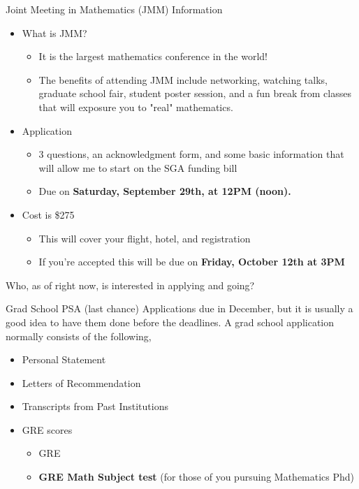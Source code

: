 \documentclass[xcolor=dvipsnames]{beamer}
\begin{document}
\begin{frame}{Joint Meeting in Mathematics (JMM) Information} 

\begin{itemize}
\item What is JMM? 
\begin{itemize}
\item It is the largest mathematics conference in the world!
\item The benefits of attending JMM include networking, watching talks, graduate school fair, student poster session, and a fun break from classes that will exposure you to "real" mathematics.
\end{itemize}
\item Application
\begin{itemize}
\item 3 questions, an acknowledgment form, and some basic information that will allow me to start on the SGA funding bill
\item Due on \textbf{Saturday, September 29th, at 12PM (noon).} 
\end{itemize}
\item Cost is \$275
\begin{itemize}
\item  This will cover your flight, hotel, and registration
\item If you're accepted this will be due on \textbf{Friday, October 12th at 3PM}
\end{itemize}
\end{itemize}

\vfill
Who, as of right now, is interested in applying and going? 
\end{frame}

\begin{frame}{Grad School PSA (last chance)}
Applications due in December, but it is usually a good idea to have them done before the deadlines. A grad school application normally consists of the following, 
\begin{itemize}
\item Personal Statement
\item Letters of Recommendation
\item Transcripts from Past Institutions
\item GRE scores
\begin{itemize}
\item GRE 
\item \textbf{GRE Math Subject test }(for those of you pursuing Mathematics Phd) 

\end{itemize}
\end{itemize}
\end{frame}
\end{document}
